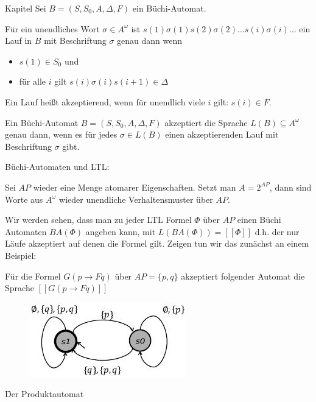 \begin{chapter}{Kapitel}
\noindent Sei $B=(S,S_0,A,\Delta,F)$ ein Büchi-Automat. 

\noindent Für ein unendliches Wort $\sigma \in A^\omega$ ist $s(1)\sigma(1)s(2)\sigma(2)\dots s(i)\sigma(i)\dots$ ein Lauf in $B$ mit Beschriftung $\sigma$ 
genau dann wenn
\begin{itemize}
 \item $s(1) \in S_0$ und
 \item für alle $i$ gilt $s(i)\sigma(i)s(i+1)\in \Delta$
\end{itemize}
Ein Lauf heißt akzeptierend, wenn für unendlich viele $i$ gilt: $s(i)\in F$. 

Ein Büchi-Automat $B = (S,S_0,A,\Delta,F)$ akzeptiert die Sprache $L(B) \subseteq A^\omega$ genau dann, wenn es für jedes $\sigma\in L(B)$ einen akzeptierenden 
Lauf mit Beschriftung $\sigma$ gibt. 
\vspace*{5pt}

\f{Büchi-Automaten und LTL}:
\vspace*{5pt}

\noindent Sei $AP$ wieder eine Menge atomarer Eigenschaften. Setzt man $A = 2^{AP}$, dann sind Worte aus $A^\omega$ wieder unendliche Verhaltensmuster über $AP$. 
\vspace*{5pt}

\noindent Wir werden sehen, dass man zu jeder LTL Formel $\Phi$ über $AP$ einen Büchi Automaten $BA(\Phi)$ angeben kann, mit $L(BA(\Phi)) = [[\Phi]]$ d.h. der nur
Läufe akzeptiert auf denen die Formel gilt. Zeigen tun wir das zunächst an einem Beispiel:
\vspace*{5pt}

\noindent Für die Formel $G(p \rightarrow Fq)$ über $AP=\{p,q\}$ akzeptiert folgender Automat die Sprache $[[G(p\rightarrow Fq)]]$
\begin{figure}[!ht]
 \centering
 \includegraphics[scale=0.7]{pics/automatpq}
\end{figure}

\f{Der Produktautomat}
\vspace*{5pt}


\end{chapter}
